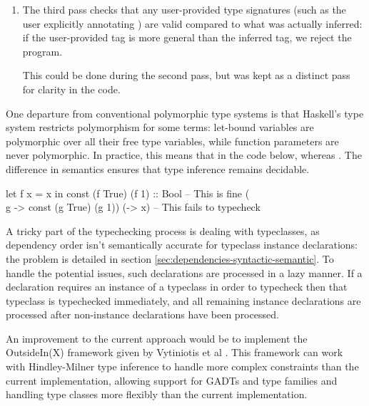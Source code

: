 \documentclass[dissertation.tex]{subfiles}
\begin{document}
{{{\begin{enumerate}
{            }
            \item
            {

                The third pass checks that any user-provided type signatures (such as the user explicitly annotating
                ) are valid compared to what was actually inferred: if the user-provided tag is more
                general than the inferred tag, we reject the program.

                This could be done during the second pass, but was kept as a distinct pass for clarity in the code.

            }
            \end{enumerate}

            One departure from conventional polymorphic type systems is that Haskell's type system restricts
            polymorphism for some terms: let-bound variables are polymorphic over all their free type variables, while
            function parameters are never polymorphic. In practice, this means that in the code below,  whereas . The
            difference in semantics ensures that type inference remains decidable.
 
            \begin{haskellfigure}
            let f x = x in const (f True) (f 1) :: Bool -- This is fine
            (\\g -> const (g True) (g 1)) (\x -> x)     -- This fails to typecheck
            \end{haskellfigure}

            A tricky part of the typechecking process is dealing with typeclasses, as dependency order isn't
            semantically accurate for typeclass instance declarations: the problem is detailed in section
            \ref{sec:dependencies-syntactic-semantic}. To handle the potential issues, such declarations are processed
            in a lazy manner. If a declaration requires an instance of a typeclass in order to typecheck then that
            typeclass is typechecked immediately, and all remaining instance declarations are processed after
            non-instance declarations have been processed.

            An improvement to the current approach would be to implement the OutsideIn(X) framework given by Vytiniotis
            et al \cite{OutsideIn}. This framework can work with Hindley-Milner type inference to handle more complex
            constraints than the current implementation, allowing support for GADTs and type families and handling type
            classes more flexibly than the current implementation.

}}}
\end{document}
